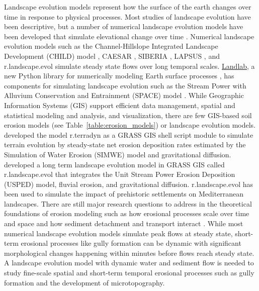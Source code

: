 \documentclass[gmd, manuscript]{copernicus}
\begin{document}
\introduction
Landscape evolution models represent how the surface of the earth changes 
over time in response to physical processes. 
Most studies of landscape evolution have been descriptive, 
but a number of numerical landscape evolution models 
have been developed that simulate elevational change over time 
\citep{Tucker2010,Temme2013}. 
Numerical landscape evolution models
such as the Channel-Hillslope Integrated Landscape Development (CHILD) model 
\citep{Tucker2001},
CAESAR \citep{Coulthard2002,Coulthard2012},
SIBERIA \citep{Willgoose2005},
LAPSUS \citep{Schoorl2000,Schoorl2002},
and r.landscape.evol \citep{Barton2010}
simulate steady state flows over long temporal scales.
\href{http://landlab.github.io/}{Landlab},
a new Python library for numerically modeling Earth surface processes
\citep{Hobley2017},
has components for simulating landscape evolution such as the 
Stream Power with Alluvium Conservation and Entrainment (SPACE) 
model \citep{Shobe2017}.
While Geographic Information Systems (GIS)
support efficient data management, 
spatial and statistical modeling and analysis, 
and visualization,
there are few GIS-based soil erosion models (see Table~\ref{table:erosion_models})
or landscape evolution models.
\cite{Thaxton2004} developed the model r.terradyn as a GRASS GIS shell script module 
to simulate terrain evolution by steady-state net erosion deposition rates
estimated by the Simulation of Water Erosion (SIMWE) model \citep{Mitas1998}
and gravitational diffusion. 
\cite{Barton2010} developed a long term landscape evolution model
in GRASS GIS called r.landscape.evol that integrates 
the Unit Stream Power Erosion Deposition (USPED) model,
fluvial erosion, and gravitational diffusion.
r.landscape.evol has been used to simulate the impact 
of prehistoric settlements on Mediterranean landscapes.
There are still major research questions 
to address in the theoretical foundations of erosion modeling 
such as how erosional processes scale over time and space 
and how sediment detachment and transport interact \citep{Mitasova2013}. 
While most numerical landscape evolution models 
simulate peak flows at steady state,
short-term erosional processes like gully formation can be dynamic
with significant morphological changes happening within minutes
before flows reach steady state. 
A landscape evolution model with dynamic water and sediment flow
is needed to study fine-scale spatial and short-term temporal erosional processes
such as gully formation and the development of microtopography. 
\end{document}
